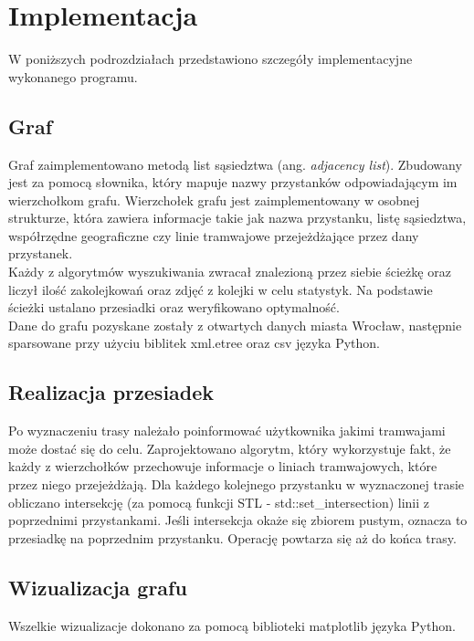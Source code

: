 \documentclass[12pt, polish]{article}
\begin{document}
\section{Implementacja}
W poniższych podrozdziałach przedstawiono szczegóły implementacyjne wykonanego programu. 

\subsection{Graf}
Graf zaimplementowano metodą list sąsiedztwa (ang. \textit{adjacency list}). Zbudowany jest za pomocą słownika, który mapuje nazwy przystanków odpowiadającym im wierzchołkom grafu. Wierzchołek grafu jest zaimplementowany w osobnej strukturze, która zawiera informacje takie jak nazwa przystanku, listę sąsiedztwa, współrzędne geograficzne czy linie tramwajowe przejeżdżające przez dany przystanek.
\\
Każdy z algorytmów wyszukiwania zwracał znalezioną przez siebie ścieżkę oraz liczył ilość zakolejkowań oraz zdjęć z kolejki w celu statystyk. Na podstawie ścieżki ustalano przesiadki oraz weryfikowano optymalność.
\\
Dane do grafu pozyskane zostały z otwartych danych miasta Wrocław, następnie sparsowane przy użyciu biblitek xml.etree oraz csv języka Python.

\subsection{Realizacja przesiadek}
Po wyznaczeniu trasy należało poinformować użytkownika jakimi tramwajami może dostać się do celu. Zaprojektowano algorytm, który wykorzystuje fakt, że każdy z wierzchołków przechowuje informacje o liniach tramwajowych, które przez niego przejeżdżają. Dla każdego kolejnego przystanku w wyznaczonej trasie obliczano intersekcję (za pomocą funkcji STL - std::set\_intersection) linii z poprzednimi przystankami. Jeśli intersekcja okaże się zbiorem pustym, oznacza to przesiadkę na poprzednim przystanku. Operację powtarza się aż do końca trasy.

\subsection{Wizualizacja grafu}
Wszelkie wizualizacje dokonano za pomocą biblioteki matplotlib języka Python.
\end{document}
